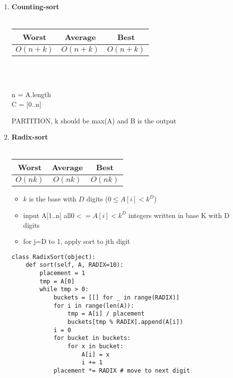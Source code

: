 \documentclass[11pt]{article}
\begin{document}
\begin{enumerate}
    \item \textbf{Counting-sort} \\\\
    \begin{tabular}{c|c|c}
        Worst & Average & Best \\
        \hline
        $O(n+k)$ & $O(n+k)$ & $O(n+k)$
    \end{tabular}
    \\
    \begin{algorithm}[H]
        \Indm{} \\
        \Indp
            n = A.length \\
            C = [0..n] \\
        \caption{PARTITION, k should be max(A) and B is the output}
    \end{algorithm}

    \item \textbf{Radix-sort} \\\\
    \begin{tabular}{c|c|c}
        Worst & Average & Best \\
        \hline
        $O(nk)$ & $O(nk)$ & $O(nk)$
    \end{tabular}
    \begin{itemize}
        \item $k$ is the base with $D$ digits ($0 \leq A[i] < k^D$)
        \item input A[1..n] all$0 <= A[i] < k^D$ integers written in base K with D digits
        \item for j=D to 1, apply sort to jth digit
    \end{itemize}
    \begin{verbatim}
class RadixSort(object):
    def sort(self, A, RADIX=10):
        placement = 1
        tmp = A[0]
        while tmp > 0:
            buckets = [[] for _ in range(RADIX)]
            for i in range(len(A)):
                tmp = A[i] / placement
                buckets[tmp % RADIX].append(A[i])
            i = 0
            for bucket in buckets:
                for x in bucket:
                    A[i] = x
                    i += 1
            placement *= RADIX # move to next digit
    \end{verbatim}


\end{enumerate}
\end{document}
